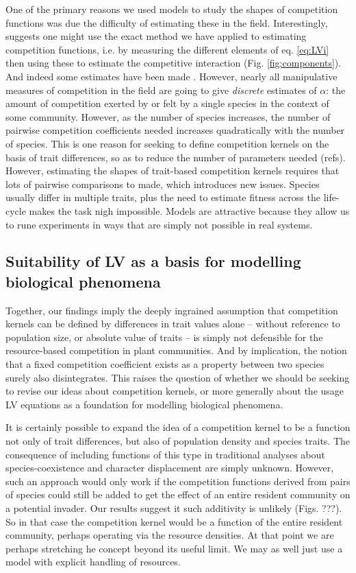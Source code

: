 \documentclass[a4paper,11pt]{article}
\begin{document}
One of the primary reasons we used models to study the shapes of competition
functions was due the difficulty of estimating these in the field.
Interestingly, \citet{Ricklefs-1973} suggests one might use the exact  method
we have applied to estimating competition functions, i.e. by measuring the
different elements of eq. \ref{eq:LVi} then using these to estimate the
competitive interaction (Fig. \ref{fig:components}). And indeed some
estimates have been made \citep{Ricklefs-1973}. However, nearly all
manipulative measures of competition in the field are going to give
\emph{discrete} estimates of $\alpha$: the amount of competition exerted by
or felt by a single species in the context of some community. However, as
the number of species increases, the number of pairwise competition
coefficients needed increases quadratically with the number of species. This is
one reason for seeking to define competition kernels on the basis of
trait differences, so as to reduce the number of parameters needed (refs).
However, estimating the shapes of trait-based competition kernels requires
that lots of pairwise comparisons to made, which introduces new issues.
Species usually differ in multiple traits, plus the need to estimate fitness
across the life-cycle makes the task nigh impossible. Models are attractive
because they allow us to rune experiments in ways that are simply not
possible in real systems. 

\subsection{Suitability of LV as a basis for modelling biological phenomena}

Together, our findings imply the deeply ingrained assumption that
competition kernels can be defined by differences in trait values
alone -- without reference to population size, or absolute value of traits
-- is simply not defensible for the resource-based competition in plant
communities. And by implication, the notion that a fixed competition
coefficient exists as a property between two species surely also 
disintegrates. This raises the question of whether we should be seeking to
revise our ideas about competition kernels, or more generally about the
usage LV equations as a foundation for modelling biological phenomena.

It is certainly possible to expand the idea of a competition kernel to be a
function not only of trait differences, but also of population density and
species traits. The consequence of including functions of this type in
traditional analyses about species-coexistence and character displacement are
simply unknown. However, such an approach would only work if the competition
functions derived from pairs of species could still be added to get the effect
of an entire resident community on a potential invader. Our results suggest it
such additivity is unlikely (Figs. ???). So in that case the competition
kernel would be a function of the entire resident community, perhaps operating
via the resource densities. At that point we are perhaps stretching he concept
beyond its useful limit. We may as well just use a model with explicit
handling of resources.
\end{document}
